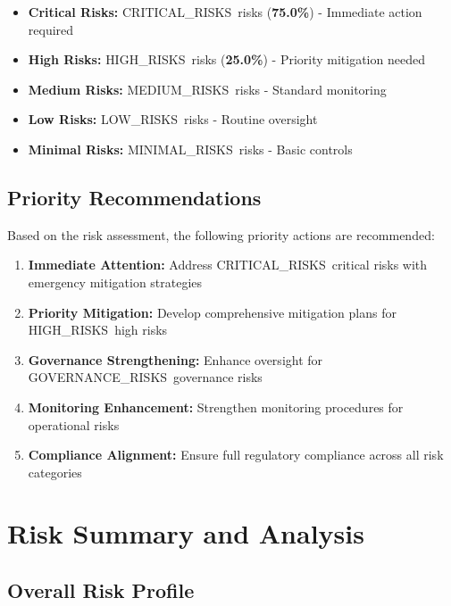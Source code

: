 \documentclass[11pt,a4paper]{article}
\newcommand{\criticalrisks}{{{CRITICAL_RISKS}}}
\newcommand{\highrisks}{{{HIGH_RISKS}}}
\newcommand{\mediumrisks}{{{MEDIUM_RISKS}}}
\newcommand{\lowrisks}{{{LOW_RISKS}}}
\newcommand{\minimalrisks}{{{MINIMAL_RISKS}}}
\newcommand{\governancerisks}{{{GOVERNANCE_RISKS}}}
\begin{document}
\begin{itemize}[leftmargin=2cm]
\item \textcolor{criticalred}{\textbf{Critical Risks:}} \criticalrisks\ risks (\textbf{75.0\%}) - Immediate action required
\item \textcolor{highorange}{\textbf{High Risks:}} \highrisks\ risks (\textbf{25.0\%}) - Priority mitigation needed
\item \textcolor{mediumyellow}{\textbf{Medium Risks:}} \mediumrisks\ risks - Standard monitoring
\item \textcolor{lowlightgreen}{\textbf{Low Risks:}} \lowrisks\ risks - Routine oversight
\item \textcolor{minimalgreen}{\textbf{Minimal Risks:}} \minimalrisks\ risks - Basic controls
\end{itemize}

\subsection{Priority Recommendations}

Based on the risk assessment, the following priority actions are recommended:

\begin{enumerate}[leftmargin=2cm]
\item \textbf{Immediate Attention:} Address \criticalrisks\ critical risks with emergency mitigation strategies
\item \textbf{Priority Mitigation:} Develop comprehensive mitigation plans for \highrisks\ high risks
\item \textbf{Governance Strengthening:} Enhance oversight for \governancerisks\ governance risks
\item \textbf{Monitoring Enhancement:} Strengthen monitoring procedures for operational risks
\item \textbf{Compliance Alignment:} Ensure full regulatory compliance across all risk categories
\end{enumerate}

\newpage

\section{Risk Summary and Analysis}

\subsection{Overall Risk Profile}
\end{document}
